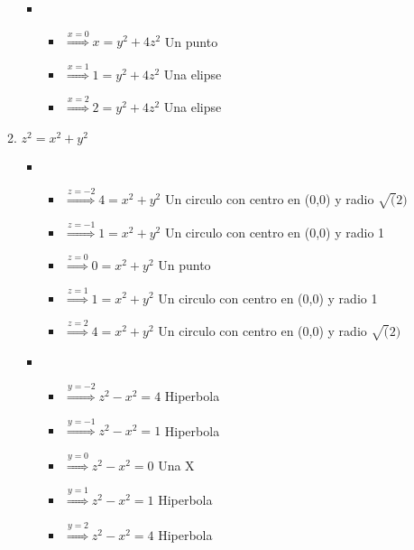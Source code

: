 \documentclass[../practica_02.tex]{subfiles}
\begin{document}
\begin{enumerate}
\begin{enumerate}
\begin{itemize}
                        \item
                            \begin{itemize}
                                \item $\stackrel{x=0}{\Rightarrow}  x = y^2 + 4z^2 $ Un punto
                                \item $\stackrel{x=1}{\Rightarrow}  1 = y^2 + 4z^2 $ Una elipse
                                \item $\stackrel{x=2}{\Rightarrow}  2 = y^2 + 4z^2 $ Una elipse
                            \end{itemize}

                    \end{itemize}

                \item $z^2 = x^2 + y^2$

                    \begin{itemize}
                        \item
                            \begin{itemize}
                                \item $\stackrel{z=-2}{\Rightarrow}  4 = x^2 + y^2 $ Un circulo con centro en (0,0) y radio $\sqrt(2)$
                                \item $\stackrel{z=-1}{\Rightarrow}  1 = x^2 + y^2 $ Un circulo con centro en (0,0) y radio 1
                                \item $\stackrel{z=0}{\Rightarrow}   0 = x^2 + y^2 $ Un punto
                                \item $\stackrel{z=1}{\Rightarrow}   1 = x^2 + y^2 $ Un circulo con centro en (0,0) y radio 1
                                \item $\stackrel{z=2}{\Rightarrow}   4 = x^2 + y^2 $ Un circulo con centro en (0,0) y radio $\sqrt(2)$
                            \end{itemize}

                        \item
                            \begin{itemize}
                                \item $\stackrel{y=-2}{\Rightarrow} z^2 - x^2 = 4 $ Hiperbola
                                \item $\stackrel{y=-1}{\Rightarrow} z^2 - x^2 = 1 $ Hiperbola
                                \item $\stackrel{y=0}{\Rightarrow}  z^2 - x^2 = 0 $ Una X
                                \item $\stackrel{y=1}{\Rightarrow}  z^2 - x^2 = 1 $ Hiperbola
                                \item $\stackrel{y=2}{\Rightarrow}  z^2 - x^2 = 4 $ Hiperbola
                            \end{itemize}


\end{itemize}
\end{enumerate}
\end{enumerate}
\end{document}
